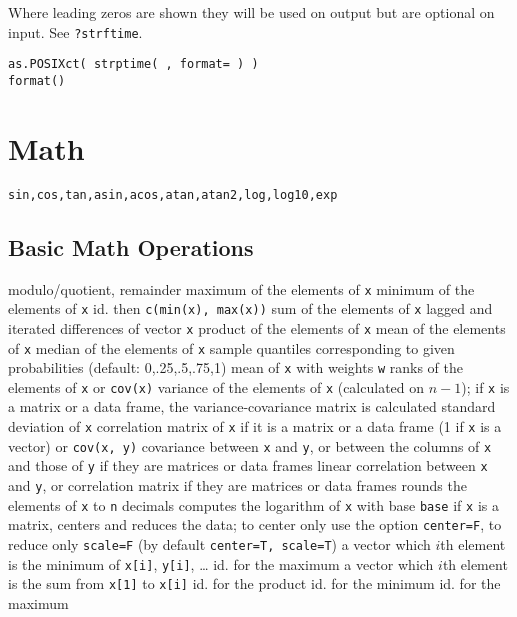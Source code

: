 {Where leading zeros are shown they will be used on output but are
optional on input. See {\tt ?strftime}.

{\tt as.POSIXct( strptime( , format= ) )\\
    format()}

\section{Math}{{\tt sin,cos,tan,asin,acos,atan,atan2,log,log10,exp}}

\subsection{Basic Math Operations}{}
\cmdS{\%\%, \%/\%}	{modulo/quotient, remainder}
	{ maximum of the elements of {\tt x}}
	{ minimum of the elements of {\tt x}}
	{ id. then {\tt c(min(x), max(x))}}
	{ sum of the elements of {\tt x}}
	{ lagged and iterated differences of vector {\tt x}}
	{ product of the elements of {\tt x}}
	{ mean of the elements of {\tt x}}
	{ median of the elements of {\tt x}}
	{sample quantiles corresponding to given
    probabilities (default: 0,.25,.5,.75,1)}
	{mean of {\tt x} with weights {\tt w}}
	{ ranks of the elements of {\tt x}}
	{or {\tt cov(x)}  variance of the elements of {\tt x}
    (calculated on $n-1$); if {\tt x} is a matrix or a data frame, the
    variance-covariance matrix is calculated}
	{standard deviation of {\tt x}}
	{correlation matrix of {\tt x} if it is a matrix or a data frame (1 if {\tt x} is a vector)}
	{or {\tt cov(x, y)}  covariance between {\tt x} and {\tt y}, or between the columns of {\tt x} and those of {\tt y} if they are matrices or data frames}
	{linear correlation between {\tt x} and {\tt y}, or correlation matrix if they are matrices or data frames}
	{rounds the elements of {\tt x} to {\tt n} decimals}
	{computes the logarithm of {\tt x} with base {\tt base}}
	{if {\tt x} is a matrix, centers and reduces the data; to
center only use the option {\tt center=F}, to reduce only {\tt scale=F}
(by default {\tt center=T, scale=T})}
	{ a vector which $i$th element is the minimum of {\tt x[i]}, {\tt y[i]}, \ldots}
	{ id. for the maximum}
	{a vector which $i$th element is the sum from {\tt x[1]} to {\tt x[i]}}
	{ id. for the product}
	{ id. for the minimum}
	{ id. for the maximum}

}
